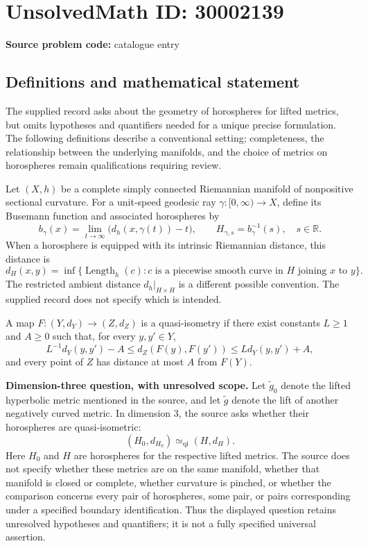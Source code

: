 \documentclass[11pt]{article}
\newcommand{\R}{\mathbb{R}}
\begin{document}
\section*{UnsolvedMath ID: 30002139}
\textbf{Source problem code:} catalogue entry
\subsection{Definitions and mathematical statement}
The supplied record asks about the geometry of horospheres for lifted metrics, but omits hypotheses and quantifiers needed for a unique precise formulation. The following definitions describe a conventional setting; completeness, the relationship between the underlying manifolds, and the choice of metrics on horospheres remain qualifications requiring review.

Let \((X,h)\) be a complete simply connected Riemannian manifold of nonpositive sectional curvature. For a unit-speed geodesic ray \(\gamma:[0,\infty)\to X\), define its Busemann function and associated horospheres by
\[
 b_\gamma(x)=\lim_{t\to\infty}\bigl(d_h(x,\gamma(t))-t\bigr),
 \qquad H_{\gamma,s}=b_\gamma^{-1}(s),\quad s\in\R.
\]
When a horosphere is equipped with its intrinsic Riemannian distance, this distance is
\[
 d_H(x,y)=\inf\{\operatorname{Length}_h(c):c\text{ is a piecewise smooth curve in }H\text{ joining }x\text{ to }y\}.
\]
The restricted ambient distance \(d_h|_{H\times H}\) is a different possible convention. The supplied record does not specify which is intended.

A map \(F:(Y,d_Y)\to(Z,d_Z)\) is a quasi-isometry if there exist constants \(L\geq1\) and \(A\geq0\) such that, for every \(y,y'\in Y\),
\[
 L^{-1}d_Y(y,y')-A\leq d_Z(F(y),F(y'))\leq Ld_Y(y,y')+A,
\]
and every point of \(Z\) has distance at most \(A\) from \(F(Y)\).

\textbf{Dimension-three question, with unresolved scope.} Let \(\widetilde g_0\) denote the lifted hyperbolic metric mentioned in the source, and let \(\widetilde g\) denote the lift of another negatively curved metric. In dimension \(3\), the source asks whether their horospheres are quasi-isometric:
\[
 (H_0,d_{H_0})\simeq_{\mathrm{qi}}(H,d_H).
\]
Here \(H_0\) and \(H\) are horospheres for the respective lifted metrics. The source does not specify whether these metrics are on the same manifold, whether that manifold is closed or complete, whether curvature is pinched, or whether the comparison concerns every pair of horospheres, some pair, or pairs corresponding under a specified boundary identification. Thus the displayed question retains unresolved hypotheses and quantifiers; it is not a fully specified universal assertion.
\end{document}
